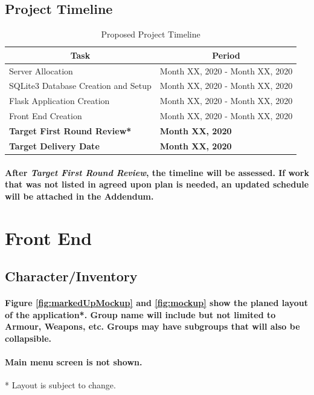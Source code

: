 \documentclass[12pt,letterpaper]{article}
\begin{document}
		\subsection{Project Timeline}
			\begin{table}[hbt]
				\begin{tabular}{|l|l|}
					\hline
					\multicolumn{1}{|c|}{Task} & \multicolumn{1}{|c|}{Period} \\ \hline
					Server Allocation & Month XX, 2020 - Month XX, 2020 \\ \hline
					SQLite3 Database Creation and Setup & Month XX, 2020 - Month XX, 2020 \\ \hline
					Flask Application Creation & Month XX, 2020 - Month XX, 2020 \\ \hline
					Front End Creation & Month XX, 2020 - Month XX, 2020 \\ \hline
					\bf{Target First Round Review*} & \bf{Month XX, 2020} \\ \hline
					\bf{Target Delivery Date} & \bf{Month XX, 2020} \\ \hline
				\end{tabular}
				\caption{Proposed Project Timeline}
				\label{tab:tableProjectTimeline}
			\end{table}
			\paragraph{\indent *After \emph{Target First Round Review}, the timeline will be assessed. If work that was not listed in agreed upon plan is needed, an updated schedule will be attached in the Addendum.\\}
	\section{Front End}
		\subsection{Character/Inventory}
		\paragraph{\indent Figure \ref{fig:markedUpMockup} and \ref{fig:mockup} show the planed layout of the application*. Group name will include but not limited to Armour, Weapons, etc. Groups may have subgroups that will also be collapsible. }
		\paragraph{\indent Main menu screen is not shown.}
		* Layout is subject to change.
\end{document}
